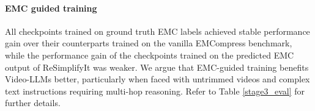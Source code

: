 \paragraph{EMC guided training} All checkpoints trained on ground truth EMC labels achieved stable performance gain over their counterparts trained on the vanilla EMCompress benchmark, while the performance gain of the checkpoints trained on the predicted EMC output of ReSimplifyIt was weaker. We argue that EMC-guided training benefits Video-LLMs better, particularly when faced with untrimmed videos and complex text instructions requiring multi-hop reasoning. Refer to Table \ref{stage3_eval} for further details.





  
  
